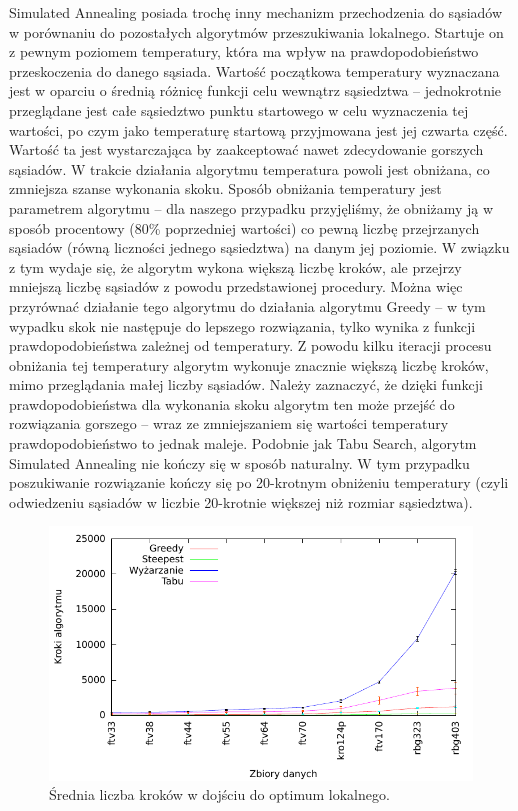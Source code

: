 Simulated Annealing posiada trochę inny mechanizm przechodzenia do sąsiadów w porównaniu do pozostałych algorytmów przeszukiwania lokalnego. Startuje on z pewnym poziomem temperatury, która ma wpływ na prawdopodobieństwo przeskoczenia do danego sąsiada. Wartość początkowa temperatury wyznaczana jest w oparciu o średnią różnicę funkcji celu wewnątrz sąsiedztwa -- jednokrotnie przeglądane jest całe sąsiedztwo punktu startowego w celu wyznaczenia tej wartości, po czym jako temperaturę startową przyjmowana jest jej czwarta część. Wartość ta jest wystarczająca by zaakceptować nawet zdecydowanie gorszych sąsiadów. W trakcie działania algorytmu temperatura powoli jest obniżana, co zmniejsza szanse wykonania skoku. Sposób obniżania temperatury jest parametrem algorytmu -- dla naszego przypadku przyjęliśmy, że obniżamy ją w sposób procentowy (80\% poprzedniej wartości) co pewną liczbę przejrzanych sąsiadów (równą liczności jednego sąsiedztwa) na danym jej poziomie. W związku z tym wydaje się, że algorytm wykona większą liczbę kroków, ale przejrzy mniejszą liczbę sąsiadów z powodu przedstawionej procedury. Można więc przyrównać działanie tego algorytmu do działania algorytmu Greedy -- w tym wypadku skok nie następuje do lepszego rozwiązania, tylko wynika z funkcji prawdopodobieństwa zależnej od temperatury. Z powodu kilku iteracji procesu obniżania tej temperatury algorytm wykonuje znacznie większą liczbę kroków, mimo przeglądania małej liczby sąsiadów. Należy zaznaczyć, że dzięki funkcji prawdopodobieństwa dla wykonania skoku algorytm ten może przejść do rozwiązania gorszego -- wraz ze zmniejszaniem się wartości temperatury prawdopodobieństwo to jednak maleje. Podobnie jak Tabu Search, algorytm Simulated Annealing nie kończy się w sposób naturalny. W tym przypadku poszukiwanie rozwiązanie kończy się po 20-krotnym obniżeniu temperatury (czyli odwiedzeniu sąsiadów w liczbie 20-krotnie większej niż rozmiar sąsiedztwa).

\begin{figure}[!h]
\centering\includegraphics[width=12cm]{img/loc_skoki}
\caption{Średnia liczba kroków w dojściu do optimum lokalnego.}\label{rys:loc_skoki}
\end{figure}

